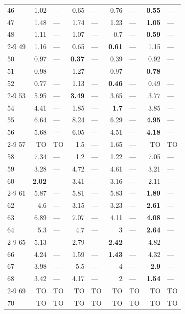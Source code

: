 \begin{longtable}{lr@{\hskip 4pt}l@{\hskip 12pt}r@{\hskip 4pt}l@{\hskip 12pt}r@{\hskip 4pt}l@{\hskip 12pt}r@{\hskip 4pt}l@{\hskip 12pt}}
46 & 1.02 & --- & 0.65 & --- & 0.76 & --- & \textbf{0.55} & --- \\
47 & 1.48 & --- & 1.74 & --- & 1.23 & --- & \textbf{1.05} & --- \\
48 & 1.11 & --- & 1.07 & --- & 0.7 & --- & \textbf{0.59} & --- \\
\cmidrule{2-9}
49 & 1.16 & --- & 0.65 & --- & \textbf{0.61} & --- & 1.15 & --- \\
50 & 0.97 & --- & \textbf{0.37} & --- & 0.39 & --- & 0.92 & --- \\
51 & 0.98 & --- & 1.27 & --- & 0.97 & --- & \textbf{0.78} & --- \\
52 & 0.77 & --- & 1.13 & --- & \textbf{0.46} & --- & 0.49 & --- \\
\cmidrule{2-9}
53 & 5.95 & --- & \textbf{3.49} & --- & 3.65 & --- & 3.77 & --- \\
54 & 4.41 & --- & 1.85 & --- & \textbf{1.7} & --- & 3.85 & --- \\
55 & 6.64 & --- & 8.24 & --- & 6.29 & --- & \textbf{4.95} & --- \\
56 & 5.68 & --- & 6.05 & --- & 4.51 & --- & \textbf{4.18} & --- \\
\cmidrule{2-9}
57 & TO & TO & 1.5 & --- & 1.65 & --- & TO & TO \\
58 & 7.34 & --- & 1.2 & --- & 1.22 & --- & 7.05 & --- \\
59 & 3.28 & --- & 4.72 & --- & 4.61 & --- & 3.21 & --- \\
60 & \textbf{2.02} & --- & 3.41 & --- & 3.16 & --- & 2.11 & --- \\
\cmidrule{2-9}
61 & 5.87 & --- & 5.81 & --- & 5.83 & --- & \textbf{1.89} & --- \\
62 & 4.6 & --- & 3.15 & --- & 3.23 & --- & \textbf{2.61} & --- \\
63 & 6.89 & --- & 7.07 & --- & 4.11 & --- & \textbf{4.08} & --- \\
64 & 5.3 & --- & 4.7 & --- & 3 & --- & \textbf{2.64} & --- \\
\cmidrule{2-9}
65 & 5.13 & --- & 2.79 & --- & \textbf{2.42} & --- & 4.82 & --- \\
66 & 4.24 & --- & 1.59 & --- & \textbf{1.43} & --- & 4.32 & --- \\
67 & 3.98 & --- & 5.5 & --- & 4 & --- & \textbf{2.9} & --- \\
68 & 3.42 & --- & 4.17 & --- & 2 & --- & \textbf{1.54} & --- \\
\cmidrule{2-9}
69 & TO & TO & TO & TO & TO & TO & TO & TO \\
70 & TO & TO & TO & TO & TO & TO & TO & TO \\

\end{longtable}
